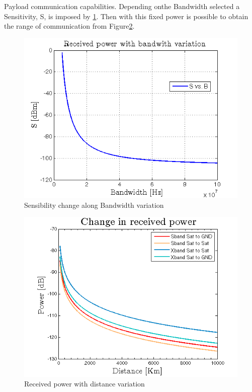 Payload communication capabilities. Depending onthe Bandwidth selected a Sensitivity, S, is imposed by \ref{SvsB}. Then with this fixed power is possible to obtain the range of communication from Figure\ref{friis}.
\begin{figure}[H]
	\includegraphics[scale=0.9]{./sections/SatelliteConfiguration/SvsB}
	\centering
	\caption{Sensibility change along Bandwidth variation}
	\label{SvsB}
\end{figure}
\clearpage
\begin{figure}[H]
	\includegraphics[scale=0.9]{./sections/SatelliteConfiguration/friisCases}
	\centering
	\caption{Received power with distance variation}
	\label{friis}
\end{figure}
\clearpage
